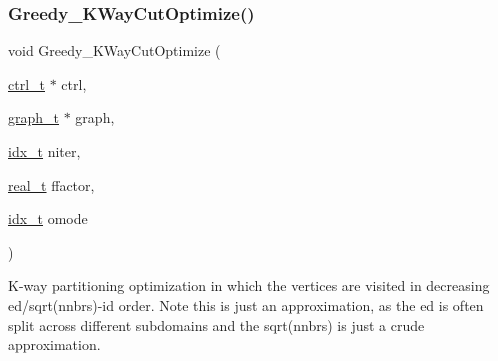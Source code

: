 \subsubsection{\texorpdfstring{Greedy\+\_\+\+K\+Way\+Cut\+Optimize()}{Greedy\_KWayCutOptimize()}}
{\footnotesize\ttfamily void Greedy\+\_\+\+K\+Way\+Cut\+Optimize (\begin{DoxyParamCaption}\item[{\hyperlink{a00742}{ctrl\+\_\+t} $\ast$}]{ctrl,  }\item[{\hyperlink{a00734}{graph\+\_\+t} $\ast$}]{graph,  }\item[{\hyperlink{a00876_aaa5262be3e700770163401acb0150f52}{idx\+\_\+t}}]{niter,  }\item[{\hyperlink{a00876_a1924a4f6907cc3833213aba1f07fcbe9}{real\+\_\+t}}]{ffactor,  }\item[{\hyperlink{a00876_aaa5262be3e700770163401acb0150f52}{idx\+\_\+t}}]{omode }\end{DoxyParamCaption})}

K-\/way partitioning optimization in which the vertices are visited in decreasing ed/sqrt(nnbrs)-\/id order. Note this is just an approximation, as the ed is often split across different subdomains and the sqrt(nnbrs) is just a crude approximation.


